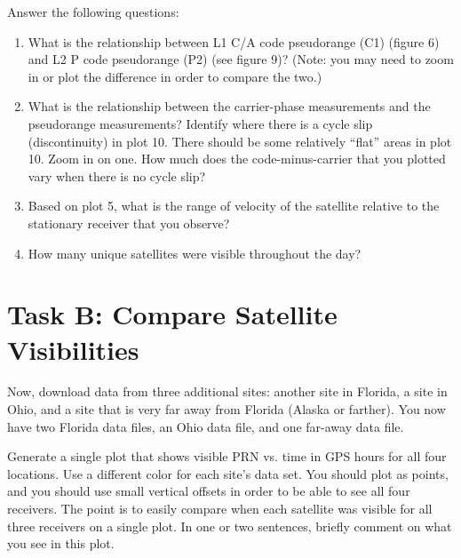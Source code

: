 \documentclass[12pt]{article}
\begin{document}
Answer the following questions:
\begin{enumerate}[label=\Alph*.]
   \item What is the relationship between L1 C/A code pseudorange (C1) (figure
      6) and L2 P code pseudorange (P2) (see figure 9)?  (Note: you may need to
      zoom in or plot the difference in order to compare the two.)
   \item What is the relationship between the carrier-phase measurements and the
      pseudorange measurements?  Identify where there is a cycle slip (discontinuity) in plot 10.
      There should be some relatively ``flat'' areas in plot 10.  Zoom in on
      one.  How much does the code-minus-carrier that you plotted vary when
      there is no cycle slip?
   \item Based on plot 5, what is the range of velocity of the satellite
      relative to the stationary receiver that you observe?
   \item How many unique satellites were visible throughout the day?
\end{enumerate}

\section*{\textsf{Task B: Compare Satellite Visibilities}}

Now, download data from three additional sites: another site in Florida, a site
in Ohio, and a site that is very far away from Florida (Alaska or farther).  You
now have two Florida data files, an Ohio data file, and one far-away data file.

Generate a single plot that shows visible PRN vs. time in GPS hours for all four
locations.  Use a different color for each site's data set.  You should plot as
points, and you should use small vertical offsets in order to be able to see all
four receivers.  The point is to easily compare when each satellite was visible
for all three receivers on a single plot.  In one or two sentences, briefly
comment on what you see in this plot.
\end{document}
